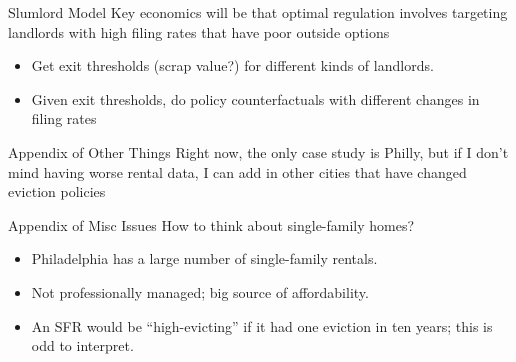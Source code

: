 \documentclass[aspectratio=169]{beamer}
\begin{document}
\begin{frame}{Slumlord Model}
Key economics will be that optimal regulation involves targeting landlords with high filing rates that have poor outside options
\begin{itemize}
  \item Get exit thresholds (scrap value?) for different kinds of landlords.
  \item Given exit thresholds, do policy counterfactuals with different changes in filing rates
\end{itemize}
\end{frame}


\appendix

\begin{frame}{Appendix of Other Things}
Right now, the only case study is Philly, but if I don't mind having worse rental data, I can add in other cities that have changed eviction policies
    
\end{frame}

\begin{frame}{Appendix of Misc Issues}
How to think about single-family homes?
\begin{itemize}
  \item Philadelphia has a large number of single-family rentals.
  \item Not professionally managed; big source of affordability.
  \item An SFR would be “high-evicting” if it had one eviction in ten years; this is odd to interpret.
\end{itemize}
\end{frame}
\end{document}
